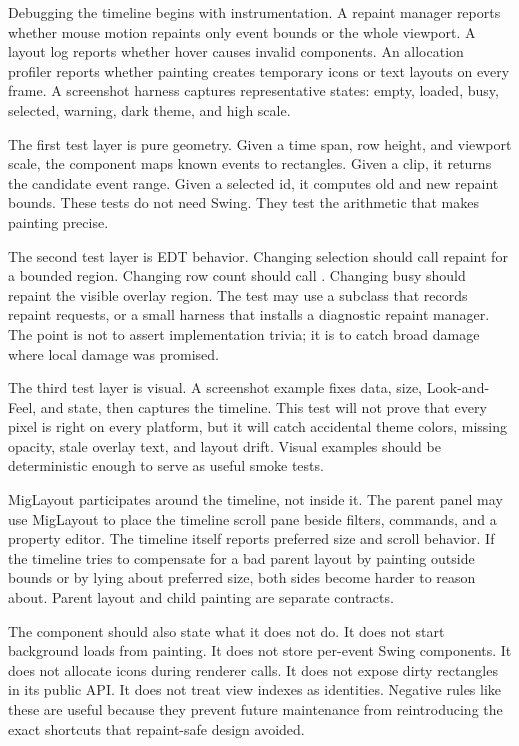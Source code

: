Debugging the timeline begins with instrumentation. A repaint manager reports whether mouse motion repaints only event bounds or the whole viewport. A layout log reports whether hover causes invalid components. An allocation profiler reports whether painting creates temporary icons or text layouts on every frame. A screenshot harness captures representative states: empty, loaded, busy, selected, warning, dark theme, and high scale.

The first test layer is pure geometry. Given a time span, row height, and viewport scale, the component maps known events to rectangles. Given a clip, it returns the candidate event range. Given a selected id, it computes old and new repaint bounds. These tests do not need Swing. They test the arithmetic that makes painting precise.

The second test layer is EDT behavior. Changing selection should call repaint for a bounded region. Changing row count should call . Changing busy should repaint the visible overlay region. The test may use a subclass that records repaint requests, or a small harness that installs a diagnostic repaint manager. The point is not to assert implementation trivia; it is to catch broad damage where local damage was promised.

The third test layer is visual. A screenshot example fixes data, size, Look-and-Feel, and state, then captures the timeline. This test will not prove that every pixel is right on every platform, but it will catch accidental theme colors, missing opacity, stale overlay text, and layout drift. Visual examples should be deterministic enough to serve as useful smoke tests.

MigLayout participates around the timeline, not inside it. The parent panel may use MigLayout to place the timeline scroll pane beside filters, commands, and a property editor. The timeline itself reports preferred size and scroll behavior. If the timeline tries to compensate for a bad parent layout by painting outside bounds or by lying about preferred size, both sides become harder to reason about. Parent layout and child painting are separate contracts.

The component should also state what it does not do. It does not start background loads from painting. It does not store per-event Swing components. It does not allocate icons during renderer calls. It does not expose dirty rectangles in its public API. It does not treat view indexes as identities. Negative rules like these are useful because they prevent future maintenance from reintroducing the exact shortcuts that repaint-safe design avoided.

